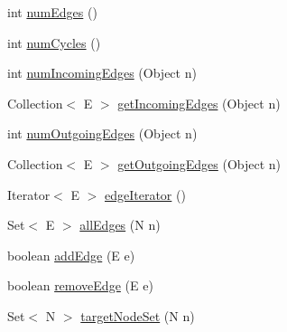 \begin{DoxyCompactItemize}
\item 
int \hyperlink{classorg_1_1tzi_1_1use_1_1graph_1_1_directed_graph_base_3_01_n_00_01_e_01extends_01_directed_edge_3_01_n_01_4_01_4_a85408431f91eb9f438bf1bafecd00f4a}{num\-Edges} ()
\item 
int \hyperlink{classorg_1_1tzi_1_1use_1_1graph_1_1_directed_graph_base_3_01_n_00_01_e_01extends_01_directed_edge_3_01_n_01_4_01_4_a6aba9d280dba36d4dde7981531ac2a71}{num\-Cycles} ()
\item 
int \hyperlink{classorg_1_1tzi_1_1use_1_1graph_1_1_directed_graph_base_3_01_n_00_01_e_01extends_01_directed_edge_3_01_n_01_4_01_4_ab5558a3ce9a7bb55c52bbbb855a3d5ee}{num\-Incoming\-Edges} (Object n)
\item 
Collection$<$ E $>$ \hyperlink{classorg_1_1tzi_1_1use_1_1graph_1_1_directed_graph_base_3_01_n_00_01_e_01extends_01_directed_edge_3_01_n_01_4_01_4_a38319936eeef42126001cbfbc0d9fe83}{get\-Incoming\-Edges} (Object n)
\item 
int \hyperlink{classorg_1_1tzi_1_1use_1_1graph_1_1_directed_graph_base_3_01_n_00_01_e_01extends_01_directed_edge_3_01_n_01_4_01_4_a7f89a27ab11cd58d14a06281409a0eb1}{num\-Outgoing\-Edges} (Object n)
\item 
Collection$<$ E $>$ \hyperlink{classorg_1_1tzi_1_1use_1_1graph_1_1_directed_graph_base_3_01_n_00_01_e_01extends_01_directed_edge_3_01_n_01_4_01_4_ab30ff9b8376f6339261d5de274c743cd}{get\-Outgoing\-Edges} (Object n)
\item 
Iterator$<$ E $>$ \hyperlink{classorg_1_1tzi_1_1use_1_1graph_1_1_directed_graph_base_3_01_n_00_01_e_01extends_01_directed_edge_3_01_n_01_4_01_4_adba974ac02ba1d1174e9d8dca48d3bf3}{edge\-Iterator} ()
\item 
Set$<$ E $>$ \hyperlink{classorg_1_1tzi_1_1use_1_1graph_1_1_directed_graph_base_3_01_n_00_01_e_01extends_01_directed_edge_3_01_n_01_4_01_4_a74e5670b15cad06a636dd104b8275fbb}{all\-Edges} (N n)
\item 
boolean \hyperlink{classorg_1_1tzi_1_1use_1_1graph_1_1_directed_graph_base_3_01_n_00_01_e_01extends_01_directed_edge_3_01_n_01_4_01_4_a4406d33467c7b04a1ed443e86c0cd3d6}{add\-Edge} (E e)
\item 
boolean \hyperlink{classorg_1_1tzi_1_1use_1_1graph_1_1_directed_graph_base_3_01_n_00_01_e_01extends_01_directed_edge_3_01_n_01_4_01_4_aa1aa5a65fc7e3f5f7e7f0b82c6185463}{remove\-Edge} (E e)
\item 
Set$<$ N $>$ \hyperlink{classorg_1_1tzi_1_1use_1_1graph_1_1_directed_graph_base_3_01_n_00_01_e_01extends_01_directed_edge_3_01_n_01_4_01_4_a1cb957c1d1aff800c67c8cd091bf98b4}{target\-Node\-Set} (N n)

\end{DoxyCompactItemize}
